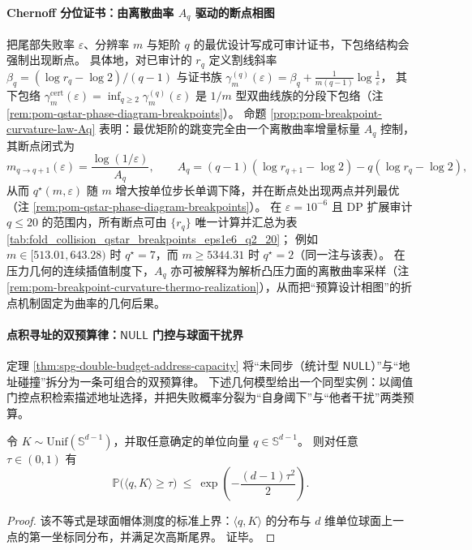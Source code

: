\paragraph{Chernoff 分位证书：由离散曲率 \texorpdfstring{$A_q$}{Aq} 驱动的断点相图}
把尾部失败率 \(\varepsilon\)、分辨率 \(m\) 与矩阶 \(q\) 的最优设计写成可审计证书，下包络结构会强制出现断点。
具体地，对已审计的 \(r_q\) 定义割线斜率 \(\beta_q=(\log r_q-\log2)/(q-1)\) 与证书族
\(
\gamma_m^{(q)}(\varepsilon)=\beta_q+\frac{1}{m(q-1)}\log\frac{1}{\varepsilon}
\)，
其下包络
\(
\gamma_m^{\mathrm{cert}}(\varepsilon)=\inf_{q\ge 2}\gamma_m^{(q)}(\varepsilon)
\)
是 \(1/m\) 型双曲线族的分段下包络（注 \ref{rem:pom-qstar-phase-diagram-breakpoints}）。
命题 \ref{prop:pom-breakpoint-curvature-law-Aq} 表明：最优矩阶的跳变完全由一个离散曲率增量标量 \(A_q\) 控制，
其断点闭式为
\[
m_{q\to q+1}(\varepsilon)=\frac{\log(1/\varepsilon)}{A_q},
\qquad
A_q=(q-1)(\log r_{q+1}-\log2)-q(\log r_q-\log2),
\]
从而 \(q^\star(m,\varepsilon)\) 随 \(m\) 增大按单位步长单调下降，并在断点处出现两点并列最优（注 \ref{rem:pom-qstar-phase-diagram-breakpoints}）。
在 \(\varepsilon=10^{-6}\) 且 DP 扩展审计 \(q\le 20\) 的范围内，所有断点可由 \(\{r_q\}\) 唯一计算并汇总为表 \ref{tab:fold_collision_qstar_breakpoints_eps1e6_q2_20}；
例如 \(m\in[513.01,643.28)\) 时 \(q^\star=7\)，而 \(m\ge 5344.31\) 时 \(q^\star=2\)（同一注与该表）。
在压力几何的连续插值制度下，\(A_q\) 亦可被解释为解析凸压力面的离散曲率采样（注 \ref{rem:pom-breakpoint-curvature-thermo-realization}），从而把“预算设计相图”的折点机制固定为曲率的几何后果。

\paragraph{点积寻址的双预算律：\texorpdfstring{$\mathsf{NULL}$}{NULL} 门控与球面干扰界}
定理 \ref{thm:spg-double-budget-address-capacity} 将“未同步（统计型 \(\mathsf{NULL}\)）”与“地址碰撞”拆分为一条可组合的双预算律。
下述几何模型给出一个同型实例：以阈值门控点积检索描述地址选择，并把失败概率分裂为“自身阈下”与“他者干扰”两类预算。

\begin{lemma}[球面点积的指数尾界]\label{lem:discussion-spherical-cap-subgaussian}
令 \(K\sim\mathrm{Unif}(\mathbb{S}^{d-1})\)，并取任意确定的单位向量 \(q\in\mathbb{S}^{d-1}\)。
则对任意 \(\tau\in(0,1)\) 有
\[
\mathbb{P}\bigl(\langle q,K\rangle\ge \tau\bigr)\ \le\ \exp\!\left(-\frac{(d-1)\tau^2}{2}\right).
\]
\end{lemma}
\begin{proof}
该不等式是球面帽体测度的标准上界：\(\langle q,K\rangle\) 的分布与 \(d\) 维单位球面上一点的第一坐标同分布，并满足次高斯尾界。
证毕。
\end{proof}

